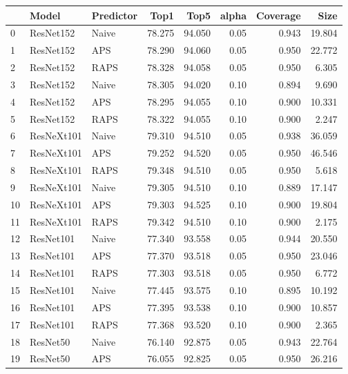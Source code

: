 \begin{tabular}{lllrrrrr}
\toprule
{} &        Model & Predictor &    Top1 &    Top5 &  alpha &  Coverage &     Size \\
\midrule
0  &    ResNet152 &     Naive &  78.275 &  94.050 &   0.05 &     0.943 &   19.804 \\
1  &    ResNet152 &       APS &  78.290 &  94.060 &   0.05 &     0.950 &   22.772 \\
2  &    ResNet152 &      RAPS &  78.328 &  94.058 &   0.05 &     0.950 &    6.305 \\
3  &    ResNet152 &     Naive &  78.305 &  94.020 &   0.10 &     0.894 &    9.690 \\
4  &    ResNet152 &       APS &  78.295 &  94.055 &   0.10 &     0.900 &   10.331 \\
5  &    ResNet152 &      RAPS &  78.322 &  94.055 &   0.10 &     0.900 &    2.247 \\
6  &   ResNeXt101 &     Naive &  79.310 &  94.510 &   0.05 &     0.938 &   36.059 \\
7  &   ResNeXt101 &       APS &  79.252 &  94.520 &   0.05 &     0.950 &   46.546 \\
8  &   ResNeXt101 &      RAPS &  79.348 &  94.510 &   0.05 &     0.950 &    5.618 \\
9  &   ResNeXt101 &     Naive &  79.305 &  94.510 &   0.10 &     0.889 &   17.147 \\
10 &   ResNeXt101 &       APS &  79.303 &  94.525 &   0.10 &     0.900 &   19.804 \\
11 &   ResNeXt101 &      RAPS &  79.342 &  94.510 &   0.10 &     0.900 &    2.175 \\
12 &    ResNet101 &     Naive &  77.340 &  93.558 &   0.05 &     0.944 &   20.550 \\
13 &    ResNet101 &       APS &  77.370 &  93.518 &   0.05 &     0.950 &   23.046 \\
14 &    ResNet101 &      RAPS &  77.303 &  93.518 &   0.05 &     0.950 &    6.772 \\
15 &    ResNet101 &     Naive &  77.445 &  93.575 &   0.10 &     0.895 &   10.192 \\
16 &    ResNet101 &       APS &  77.395 &  93.538 &   0.10 &     0.900 &   10.857 \\
17 &    ResNet101 &      RAPS &  77.368 &  93.520 &   0.10 &     0.900 &    2.365 \\
18 &     ResNet50 &     Naive &  76.140 &  92.875 &   0.05 &     0.943 &   22.764 \\
19 &     ResNet50 &       APS &  76.055 &  92.825 &   0.05 &     0.950 &   26.216 \\

\end{tabular}
